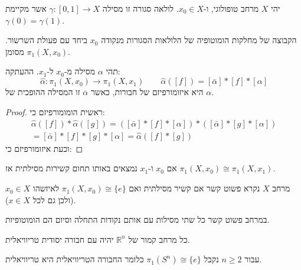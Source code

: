 \documentclass{tstextbook}
\begin{document}
\begin{definition}
יהי \(X\) מרחב טופולוגי, ו-\(x_{0} \in X\). לולאה סגורה זו מסילה \(\gamma:[0,1]\to X\) אשר מקיימת \(\gamma(0)=\gamma(1)\).

\end{definition}
\begin{definition}
הקבוצה של מחלקות הומוטופיה של הלולאות הסגורות מנקודה \(x_{0}\) ביחד עם פעולת השרשור. מסומן \(\pi_{1}(X,x_{0})\).

\end{definition}
\begin{proposition}
תהי \(\alpha\) מסילה מ-\(x_{0}\) ל-\(x_{1}\). ההעתקה:
$$\hat{\alpha}:\pi_{1}(X,x_{0})\longrightarrow\pi_{1}(X,x_{1})\qquad \hat{\alpha}([f])=[\bar{\alpha}]*[f]*[\alpha]$$
היא איזומורפיזם של חבורות, כאשר \(\overline{\alpha}\) זו המסילה ההופכית של \(\alpha\).

\end{proposition}
\begin{proof}
ראשית הומומורפיזם כי:
\begin{gather*}\hat{\alpha}([f])*\hat{\alpha}([g])=\left( \left[ \bar{\alpha} \right]*[f]*\left[ \alpha \right] \right)*\left( \left[ \bar{\alpha} \right]*[g]*\left[ \alpha \right] \right)  \\=[\bar{\alpha}]\ast[f]\ast[g]\ast[\alpha]={\hat{\alpha}}([f]\ast[g])
\end{gather*}
וכעת איזומורפיזם כי:

\end{proof}
\begin{corollary}
אם \(x_{0}\) ו-\(x_{1}\) נמצאים באותו תחום קשירות מסילתית אז  \(\pi_{1}(X,x_{0})\cong \pi_{1}(X,x_{1})\).

\end{corollary}
\begin{definition}
מרחב \(X\) נקרא פשוט קשר אם קשיר מסילתית ואם \(\pi_{1}(X,x_{0})\cong\{ e \}\) לאיזשהו \(x_{0} \in X\)(ולכן גם לכל \(x \in X\)).

\end{definition}
\begin{proposition}
במרחב פשוט קשר כל שתי מסילות עם אותם נקודות התחלה וסיום הם הומוטופיות.

\end{proposition}
\begin{example}
כל מרחב קמור של \(\mathbb{R}^{n}\) יהיה עם חבורה יסודית טריוויאלית.

\end{example}
\begin{proposition}
עבור \(n\geq 2\) נקבל \(\pi_{1}(S^{n})\cong \{ e \}\) כלומר החבורה הטריוויאלית היא טריוויאלית. 

\end{proposition}
\end{document}
